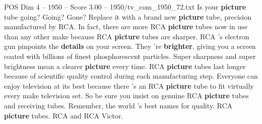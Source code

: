 \begin{textsample}{POS Dim 4 – 1950 – Score 3.00 – 1950/tv\_com\_1950\_72.txt}  \label{ex:f4_pos_085}
Is your \textbf{picture} tube going?
Going?
Gone?
Replace it with a brand new \textbf{picture} tube, precision manufactured by RCA.
In fact, there are more RCA \textbf{picture} tubes now in use than any other make because RCA \textbf{picture} tubes are sharper.
RCA 's electron gun pinpoints the \textbf{details} on your screen.
They 're \textbf{brighter}, giving you a screen coated with billions of finest phosphorescent particles.
Super sharpness and super brightness mean a clearer \textbf{picture} every time.
RCA \textbf{picture} tubes last longer because of scientific quality control during each manufacturing step.
Everyone can enjoy television at its best because there 's an RCA \textbf{picture} tube to fit virtually every make television set.
So be sure you insist on genuine RCA \textbf{picture} tubes and receiving tubes.
Remember, the world 's best names for quality.
RCA \textbf{picture} tubes.
RCA and RCA Victor.

\end{textsample}
